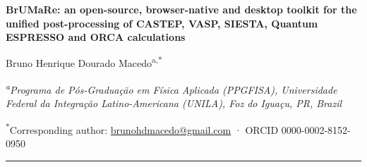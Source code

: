 \documentclass[11pt,a4paper]{article}
\newcommand{\BMR}{\textsf{BrUMa\textcolor[HTML]{B26B00}{Re}}}
\begin{document}
\begin{titlepage}
\par
\vspace{1.2cm}
\begin{center}
{\LARGE\bfseries \BMR: an open-source, browser-native and desktop toolkit for the unified post-processing of CASTEP, VASP, SIESTA, Quantum ESPRESSO and ORCA calculations\par}
\vspace{0.8cm}
{\large Bruno Henrique Dourado Macedo\textsuperscript{a,*}}\par
\vspace{0.3cm}
{\small\itshape \textsuperscript{a}Programa de Pós-Graduação em Física Aplicada (PPGFISA), Universidade Federal da Integração Latino-Americana (UNILA), Foz do Iguaçu, PR, Brazil\par}
{\small \textsuperscript{*}Corresponding author: \href{mailto:brunohdmacedo@gmail.com}{brunohdmacedo@gmail.com} · ORCID 0000-0002-8152-0950\par}
\end{center}
\vspace{0.6cm}
\noindent\rule{\linewidth}{0.4pt}

\end{titlepage}
\end{document}
